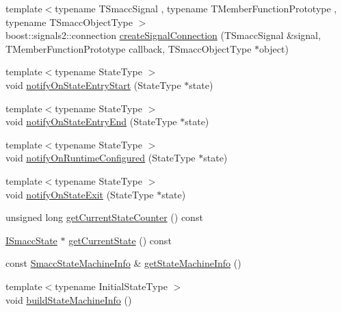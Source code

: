 \begin{DoxyCompactItemize}
\item 
{\footnotesize template$<$typename T\+Smacc\+Signal , typename T\+Member\+Function\+Prototype , typename T\+Smacc\+Object\+Type $>$ }\\boost\+::signals2\+::connection \hyperlink{classsmacc_1_1ISmaccStateMachine_adf0f42ade0c65cc471960fe2a7c42da2}{create\+Signal\+Connection} (T\+Smacc\+Signal \&signal, T\+Member\+Function\+Prototype callback, T\+Smacc\+Object\+Type $\ast$object)
\item 
{\footnotesize template$<$typename State\+Type $>$ }\\void \hyperlink{classsmacc_1_1ISmaccStateMachine_aeec54e997d715b105ebfeb5caadc4fbf}{notify\+On\+State\+Entry\+Start} (State\+Type $\ast$state)
\item 
{\footnotesize template$<$typename State\+Type $>$ }\\void \hyperlink{classsmacc_1_1ISmaccStateMachine_a856cf2d25d84659b974cccfbf44aeec9}{notify\+On\+State\+Entry\+End} (State\+Type $\ast$state)
\item 
{\footnotesize template$<$typename State\+Type $>$ }\\void \hyperlink{classsmacc_1_1ISmaccStateMachine_a7377ca0f79289fdc27f9ed3ff6e67263}{notify\+On\+Runtime\+Configured} (State\+Type $\ast$state)
\item 
{\footnotesize template$<$typename State\+Type $>$ }\\void \hyperlink{classsmacc_1_1ISmaccStateMachine_a9d2bd4aca0c80a1ec22c5f95e7c38db8}{notify\+On\+State\+Exit} (State\+Type $\ast$state)
\item 
unsigned long \hyperlink{classsmacc_1_1ISmaccStateMachine_aad27c0182b53245d0aded22e63cd83bd}{get\+Current\+State\+Counter} () const
\item 
\hyperlink{classsmacc_1_1ISmaccState}{I\+Smacc\+State} $\ast$ \hyperlink{classsmacc_1_1ISmaccStateMachine_a610d09dc5341fb63732be713c21fbe86}{get\+Current\+State} () const
\item 
const \hyperlink{classsmacc_1_1introspection_1_1SmaccStateMachineInfo}{Smacc\+State\+Machine\+Info} \& \hyperlink{classsmacc_1_1ISmaccStateMachine_a3b1facb0477325fe43b447fc21d9eb7d}{get\+State\+Machine\+Info} ()
\item 
{\footnotesize template$<$typename Initial\+State\+Type $>$ }\\void \hyperlink{classsmacc_1_1ISmaccStateMachine_a8e9c16ed0dc3dfc878548a8c6f3c47d7}{build\+State\+Machine\+Info} ()
\end{DoxyCompactItemize}
